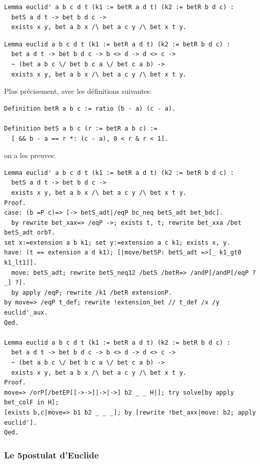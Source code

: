 \documentclass[8pt,a4paper]{article}
\theoremstyle{plain}
\begin{document}
\begin{verbatim}
Lemma euclid' a b c d t (k1 := betR a d t) (k2 := betR b d c) :
  betS a d t -> bet b d c ->
  exists x y, bet a b x /\ bet a c y /\ bet x t y.
\end{verbatim}

\begin{verbatim}
Lemma euclid a b c d t (k1 := betR a d t) (k2 := betR b d c) :
  bet a d t -> bet b d c -> b <> d -> d <> c ->
  ~ (bet a b c \/ bet b c a \/ bet c a b) ->
  exists x y, bet a b x /\ bet a c y /\ bet x t y.
\end{verbatim}

Plus précisement, avec les définitions suivantes:
\begin{verbatim}
Definition betR a b c := ratio (b - a) (c - a).

Definition betS a b c (r := betR a b c) :=
  [ && b - a == r *: (c - a), 0 < r & r < 1].
\end{verbatim}
on a les preuves:
\begin{verbatim}
Lemma euclid' a b c d t (k1 := betR a d t) (k2 := betR b d c) :
  betS a d t -> bet b d c ->
  exists x y, bet a b x /\ bet a c y /\ bet x t y.
Proof.
case: (b =P c)=> [-> betS_adt|/eqP bc_neq betS_adt bet_bdc].
  by rewrite bet_xax=> /eqP ->; exists t, t; rewrite bet_xxa /bet betS_adt orbT.
set x:=extension a b k1; set y:=extension a c k1; exists x, y.
have: (t == extension a d k1); [|move/betSP: betS_adt =>[_ k1_gt0 k1_lt1]].
  move: betS_adt; rewrite betS_neq12 /betS /betR=> /andP[/andP[/eqP ? _] ?].
  by apply /eqP; rewrite /k1 /betR extensionP.
by move=> /eqP t_def; rewrite !extension_bet // t_def /x /y euclid'_aux.
Qed.

Lemma euclid a b c d t (k1 := betR a d t) (k2 := betR b d c) :
  bet a d t -> bet b d c -> b <> d -> d <> c ->
  ~ (bet a b c \/ bet b c a \/ bet c a b) ->
  exists x y, bet a b x /\ bet a c y /\ bet x t y.
Proof.
move=> /orP[/betEP[[->->]|->|->] b2 _ _ H|]; try solve[by apply bet_colF in H];
[exists b,c|move=> b1 b2 _ _ _]; by [rewrite !bet_axx|move: b2; apply euclid'].
Qed.
\end{verbatim}

\subsubsection{Le 5\ieme postulat d'Euclide}
\end{document}
